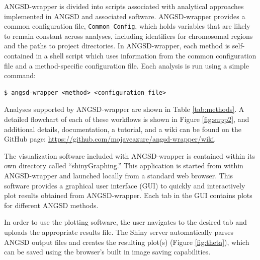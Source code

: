 \documentclass[10pt,a4paper]{article}
\begin{document}
ANGSD-wrapper is divided into scripts associated with analytical approaches implemented in ANGSD and associated software. 
ANGSD-wrapper provides a common configuration file, \texttt{Common\_Config}, which holds variables that are likely to remain constant across analyses, including identifiers for chromosomal regions and the paths to project directories.
In ANGSD-wrapper, each method is self-contained in a shell script which uses information from the common configuration file and a method-specific configuration file. 
Each analysis is run using a simple command:

\begin{lstlisting}
$ angsd-wrapper <method> <configuration_file>
\end{lstlisting}

Analyses supported by ANGSD-wrapper are shown in Table \ref{tab:methods}.
A detailed flowchart of each of these workflows is shown in Figure \ref{fig:supp2}, and additional details, documentation, a tutorial, and a wiki can be found on the GitHub page: \url{https://github.com/mojaveazure/angsd-wrapper/wiki}.

The visualization software included with ANGSD-wrapper is contained within its own directory called ``shinyGraphing.''
This application is started from within ANGSD-wrapper and launched locally from a standard web browser. %
This software provides a graphical user interface (GUI) to quickly and interactively plot results obtained from ANGSD-wrapper.  
Each tab in the GUI contains plots for different ANGSD methods.

In order to use the plotting software, the user navigates to the desired tab and uploads the appropriate results file. 
The Shiny server automatically parses ANGSD output files and creates the resulting plot(s) (Figure \ref{fig:theta}), which can be saved using the browser's built in image saving capabilities.
\end{document}
